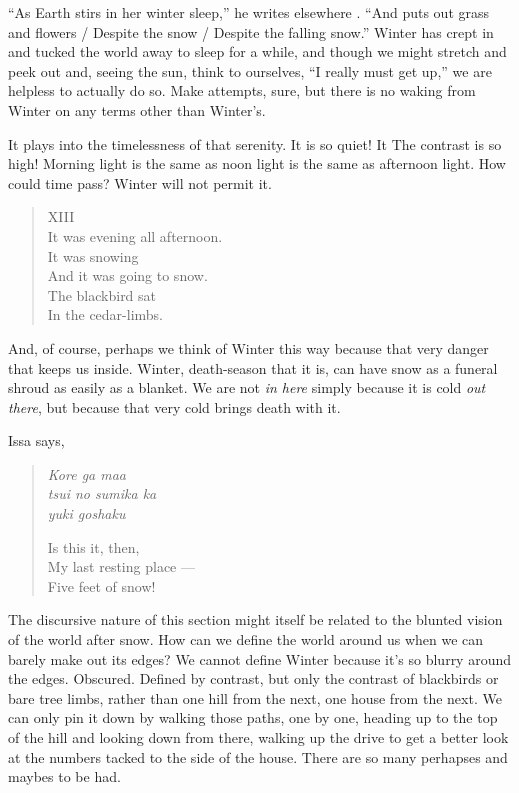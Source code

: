 \documentclass[12pt,oneside]{memoir}
\begin{document}
``As Earth stirs in her winter sleep,'' he writes elsewhere \parencite[173]{graves_poems}. ``And puts out grass and flowers / Despite the snow / Despite the falling snow.'' Winter has crept in and tucked the world away to sleep for a while, and though we might stretch and peek out and, seeing the sun, think to ourselves, ``I really must get up,'' we are helpless to actually do so. Make attempts, sure, but there is no waking from Winter on any terms other than Winter's.

It plays into the timelessness of that serenity. It is so quiet! It The contrast is so high! Morning light is the same as noon light is the same as afternoon light. How could time pass? Winter will not permit it.

\begin{verse}
XIII \\
It was evening all afternoon. \\
It was snowing \\
And it was going to snow. \\
The blackbird sat \\
In the cedar-limbs.

\parencite{blackbird}
\end{verse}

And, of course, perhaps we think of Winter this way because that very danger that keeps us inside. Winter, death-season that it is, can have snow as a funeral shroud as easily as a blanket. We are not \emph{in here} simply because it is cold \emph{out there}, but because that very cold brings death with it.

Issa says,

\begin{verse}
\emph{Kore ga maa} \\
\emph{tsui no sumika ka} \\
\emph{yuki goshaku}

Is this it, then, \\
My last resting place --- \\
Five feet of snow!

\parencite[37]{issa}
\end{verse}

The discursive nature of this section might itself be related to the blunted vision of the world after snow. How can we define the world around us when we can barely make out its edges? We cannot define Winter because it's so blurry around the edges. Obscured. Defined by contrast, but only the contrast of blackbirds or bare tree limbs, rather than one hill from the next, one house from the next. We can only pin it down by walking those paths, one by one, heading up to the top of the hill and looking down from there, walking up the drive to get a better look at the numbers tacked to the side of the house. There are so many perhapses and maybes to be had.
\end{document}
